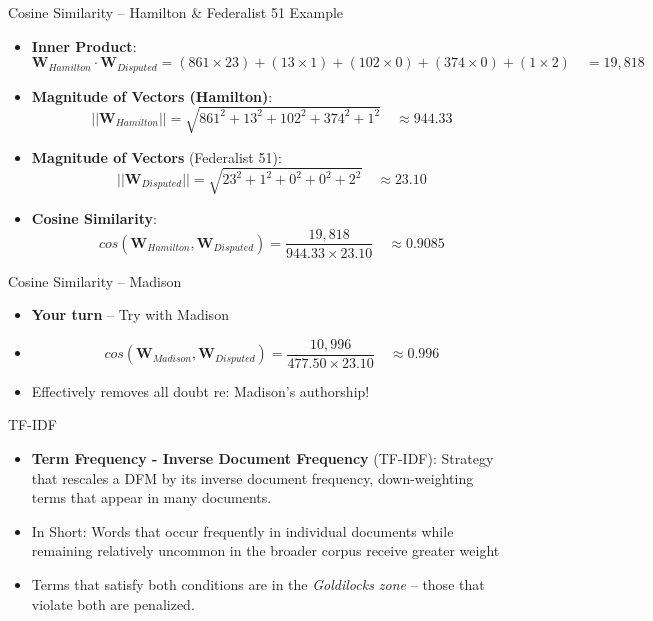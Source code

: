\documentclass[
  ignorenonframetext,
  aspectratio=169]{beamer}
\begin{document}
\begin{frame}{Cosine Similarity -- Hamilton \& Federalist 51 Example}
\label{cosine-similarity-hamilton-federalist-51-example}
\begin{itemize}
\item \textbf{Inner Product}: $$ \mathbf{W}_{Hamilton} \cdot \mathbf{W}_{Disputed} = (861 \times 23) + (13 \times 1) + (102 \times 0) + (374 \times 0) + (1 \times 2) \quad = 19,818 $$ \pause
\item \textbf{Magnitude of Vectors (Hamilton)}: $$||\mathbf{W}_{Hamilton}|| = \sqrt{861^2 + 13^2 + 102^2 + 374^2 + 1^2} \quad \approx 944.33$$ \pause
\item \textbf{Magnitude of Vectors} (Federalist 51): $$ ||\mathbf{W}_{Disputed}||  = \sqrt{23^2 + 1^2 + 0^2 + 0^2 + 2^2} \quad \approx 23.10$$ \pause
\item \textbf{Cosine Similarity}: $$cos(\mathbf{W}_{Hamilton}, \mathbf{W}_{Disputed}) = \frac{19,818}{944.33 \times 23.10} \quad \approx 0.9085 $$
\end{itemize}
\end{frame}

\begin{frame}{Cosine Similarity -- Madison}
\label{cosine-similarity-madison}
\begin{itemize}
\item \textbf{Your turn} -- Try with Madison \pause
\item[] $$cos(\mathbf{W}_{Madison}, \mathbf{W}_{Disputed}) = \frac{10,996}{477.50 \times 23.10} \quad \approx 0.996$$ \pause
\item Effectively removes all doubt re: Madison's authorship!
\end{itemize}
\end{frame}

\begin{frame}{TF-IDF}
\label{tf-idf}
\begin{itemize}
\item \textbf{Term Frequency - Inverse Document Frequency} (TF-IDF): Strategy that rescales a DFM by its inverse document frequency, down-weighting terms that appear in many documents. \par \vspace{2.5mm}
\item In Short: Words that occur frequently in individual documents while remaining relatively uncommon in the broader corpus receive greater weight \par \vspace{2.5mm}
\item Terms that satisfy both conditions are in the \textit{Goldilocks zone} -- those that violate both are penalized.
\end{itemize}
\end{frame}
\end{document}
